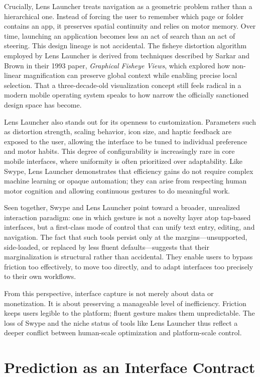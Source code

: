\documentclass[11pt]{article}
\begin{document}
Crucially, Lens Launcher treats navigation as a geometric problem rather than a hierarchical one. Instead of forcing the user to remember which page or folder contains an app, it preserves spatial continuity and relies on motor memory. Over time, launching an application becomes less an act of search than an act of steering. This design lineage is not accidental. The fisheye distortion algorithm employed by Lens Launcher is derived from techniques described by Sarkar and Brown in their 1993 paper, \textit{Graphical Fisheye Views}, which explored how non-linear magnification can preserve global context while enabling precise local selection. That a three-decade-old visualization concept still feels radical in a modern mobile operating system speaks to how narrow the officially sanctioned design space has become.

Lens Launcher also stands out for its openness to customization. Parameters such as distortion strength, scaling behavior, icon size, and haptic feedback are exposed to the user, allowing the interface to be tuned to individual preference and motor habits. This degree of configurability is increasingly rare in core mobile interfaces, where uniformity is often prioritized over adaptability. Like Swype, Lens Launcher demonstrates that efficiency gains do not require complex machine learning or opaque automation; they can arise from respecting human motor cognition and allowing continuous gestures to do meaningful work.

Seen together, Swype and Lens Launcher point toward a broader, unrealized interaction paradigm: one in which gesture is not a novelty layer atop tap-based interfaces, but a first-class mode of control that can unify text entry, editing, and navigation. The fact that such tools persist only at the margins—unsupported, side-loaded, or replaced by less fluent defaults—suggests that their marginalization is structural rather than accidental. They enable users to bypass friction too effectively, to move too directly, and to adapt interfaces too precisely to their own workflows.

From this perspective, interface capture is not merely about data or monetization. It is about preserving a manageable level of inefficiency. Friction keeps users legible to the platform; fluent gesture makes them unpredictable. The loss of Swype and the niche status of tools like Lens Launcher thus reflect a deeper conflict between human-scale optimization and platform-scale control.


\section{Prediction as an Interface Contract}
\end{document}
